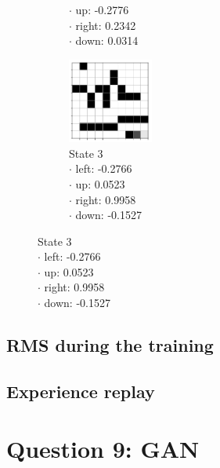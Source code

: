 \documentclass[a4paper]{article}    %
\begin{document}
\begin{figure}[H]
\begin{subfigure}{0.24\textwidth}
{            \hspace*{5mm} $\boldsymbol{\cdot}$ up:    -0.2776 \\
            \hspace*{5mm} $\boldsymbol{\cdot}$ right:  0.2342 \\
            \hspace*{5mm} $\boldsymbol{\cdot}$ down:   0.0314 }
        \label{fig:maze2-case2-state2}
    \end{subfigure}
    \hfill
    \begin{subfigure}{0.24\textwidth}
        \centering
        \includegraphics[width=2.8cm]{maze2-case2-state3}
        \caption{State 3 \\
            \scriptsize
            \hspace*{5mm} $\boldsymbol{\cdot}$ left:  -0.2766 \\
            \hspace*{5mm} $\boldsymbol{\cdot}$ up:     0.0523 \\
            \hspace*{5mm} $\boldsymbol{\cdot}$ right:  0.9958 \\
            \hspace*{5mm} $\boldsymbol{\cdot}$ down:  -0.1527 }
        \label{fig:maze2-case2-state3}
    \end{subfigure}
\end{figure}

\newpage
\subsection{RMS during the training}

\subsection{Experience replay}

\newpage
\section{Question 9: GAN}
\end{document}
